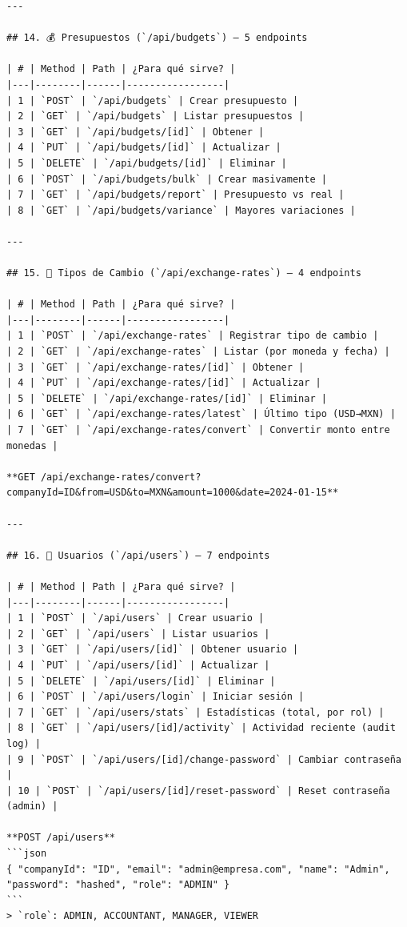 \documentclass[12pt, a4paper, oneside]{book}
\begin{document}
\begin{lstlisting}
---

## 14. 💰 Presupuestos (`/api/budgets`) — 5 endpoints

| # | Method | Path | ¿Para qué sirve? |
|---|--------|------|-----------------|
| 1 | `POST` | `/api/budgets` | Crear presupuesto |
| 2 | `GET` | `/api/budgets` | Listar presupuestos |
| 3 | `GET` | `/api/budgets/[id]` | Obtener |
| 4 | `PUT` | `/api/budgets/[id]` | Actualizar |
| 5 | `DELETE` | `/api/budgets/[id]` | Eliminar |
| 6 | `POST` | `/api/budgets/bulk` | Crear masivamente |
| 7 | `GET` | `/api/budgets/report` | Presupuesto vs real |
| 8 | `GET` | `/api/budgets/variance` | Mayores variaciones |

---

## 15. 💱 Tipos de Cambio (`/api/exchange-rates`) — 4 endpoints

| # | Method | Path | ¿Para qué sirve? |
|---|--------|------|-----------------|
| 1 | `POST` | `/api/exchange-rates` | Registrar tipo de cambio |
| 2 | `GET` | `/api/exchange-rates` | Listar (por moneda y fecha) |
| 3 | `GET` | `/api/exchange-rates/[id]` | Obtener |
| 4 | `PUT` | `/api/exchange-rates/[id]` | Actualizar |
| 5 | `DELETE` | `/api/exchange-rates/[id]` | Eliminar |
| 6 | `GET` | `/api/exchange-rates/latest` | Último tipo (USD→MXN) |
| 7 | `GET` | `/api/exchange-rates/convert` | Convertir monto entre monedas |

**GET /api/exchange-rates/convert?companyId=ID&from=USD&to=MXN&amount=1000&date=2024-01-15**

---

## 16. 👤 Usuarios (`/api/users`) — 7 endpoints

| # | Method | Path | ¿Para qué sirve? |
|---|--------|------|-----------------|
| 1 | `POST` | `/api/users` | Crear usuario |
| 2 | `GET` | `/api/users` | Listar usuarios |
| 3 | `GET` | `/api/users/[id]` | Obtener usuario |
| 4 | `PUT` | `/api/users/[id]` | Actualizar |
| 5 | `DELETE` | `/api/users/[id]` | Eliminar |
| 6 | `POST` | `/api/users/login` | Iniciar sesión |
| 7 | `GET` | `/api/users/stats` | Estadísticas (total, por rol) |
| 8 | `GET` | `/api/users/[id]/activity` | Actividad reciente (audit log) |
| 9 | `POST` | `/api/users/[id]/change-password` | Cambiar contraseña |
| 10 | `POST` | `/api/users/[id]/reset-password` | Reset contraseña (admin) |

**POST /api/users**
```json
{ "companyId": "ID", "email": "admin@empresa.com", "name": "Admin", "password": "hashed", "role": "ADMIN" }
```
> `role`: ADMIN, ACCOUNTANT, MANAGER, VIEWER


\end{lstlisting}
\end{document}
